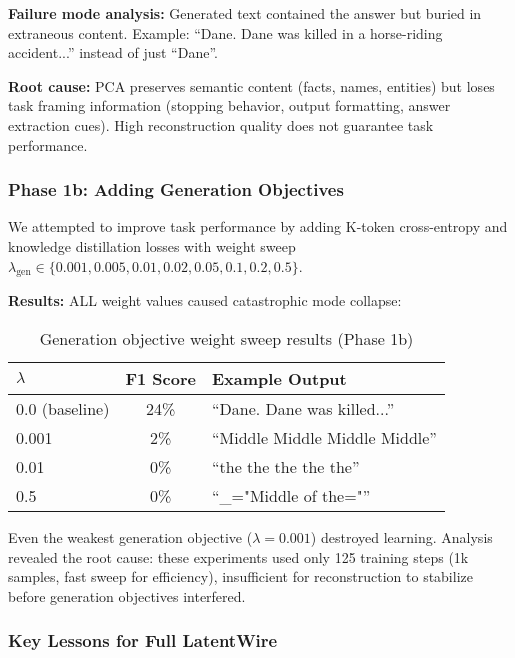 \documentclass{article}
\begin{document}
\textbf{Failure mode analysis:} Generated text contained the answer but buried in extraneous content. Example: ``Dane. Dane was killed in a horse-riding accident...'' instead of just ``Dane''.

\textbf{Root cause:} PCA preserves semantic content (facts, names, entities) but loses task framing information (stopping behavior, output formatting, answer extraction cues). High reconstruction quality does not guarantee task performance.

\subsubsection{Phase 1b: Adding Generation Objectives}

We attempted to improve task performance by adding K-token cross-entropy and knowledge distillation losses with weight sweep $\lambda_{\text{gen}} \in \{0.001, 0.005, 0.01, 0.02, 0.05, 0.1, 0.2, 0.5\}$.

\textbf{Results:} ALL weight values caused catastrophic mode collapse:

\begin{table}[h]
\caption{Generation objective weight sweep results (Phase 1b)}
\label{tab:phase1b_collapse}
\vskip 0.15in
\begin{center}
\begin{small}
\begin{tabular}{lcl}
\toprule
$\lambda$ & F1 Score & Example Output \\
\midrule
0.0 (baseline) & 24\% & ``Dane. Dane was killed...'' \\
0.001 & 2\% & ``Middle Middle Middle Middle'' \\
0.01 & 0\% & ``the the the the the'' \\
0.5 & 0\% & ``\_="Middle of the="'' \\
\bottomrule
\end{tabular}
\end{small}
\end{center}
\vskip -0.1in
\end{table}

Even the weakest generation objective ($\lambda=0.001$) destroyed learning. Analysis revealed the root cause: these experiments used only 125 training steps (1k samples, fast sweep for efficiency), insufficient for reconstruction to stabilize before generation objectives interfered.

\subsubsection{Key Lessons for Full LatentWire}
\end{document}
